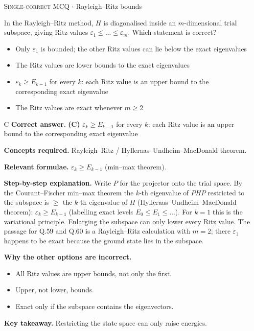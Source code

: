 \documentclass[11pt,a4paper]{article}
\newcommand{\optlabel}[1]{\textbf{(#1)}}
\newcommand{\correctlabel}[1]{\textcolor{okgreen}{\textbf{(#1)}\,\ding{51}}}
\newenvironment{qitem}[1]{\begin{list}{}{\setlength{\leftmargin}{3.3em}\setlength{\labelwidth}{3.1em}%
  \setlength{\labelsep}{0.2em}\setlength{\topsep}{3pt}\setlength{\parsep}{3pt}}\item[\textbf{Q.#1}\hfill]}{\end{list}}
\newcommand{\qsep}{\par\vspace{2pt}{\color{black!15}\hrule}\vspace{4pt}}
\newcommand{\qmeta}[2]{{\footnotesize\color{black!60}\textsc{#1} \;$\cdot$\; #2}\par}
\begin{document}
\begin{qitem}{42}
\qmeta{Single-correct MCQ}{Rayleigh--Ritz bounds}
In the Rayleigh--Ritz method, $H$ is diagonalised inside an $m$-dimensional trial subspace, giving Ritz values $\varepsilon_1 \le \dots \le \varepsilon_m$. Which
statement is correct?
\begin{itemize}[leftmargin=2.6em, labelsep=0.4em, itemsep=2pt, topsep=3pt]
\item[\optlabel{A}] Only $\varepsilon_1$ is bounded; the other Ritz values can lie below the exact eigenvalues
\item[\optlabel{B}] The Ritz values are lower bounds to the exact eigenvalues
\item[\correctlabel{C}] $\varepsilon_k \ge E_{k-1}$ for every $k$: each Ritz value is an upper bound to the corresponding exact eigenvalue
\item[\optlabel{D}] The Ritz values are exact whenever $m \ge 2$
\end{itemize}
\end{qitem}
\begin{solbox}{C}
\textbf{\color{brand}Correct answer.} \textcolor{okgreen}{\textbf{(C)}} $\varepsilon_k \ge E_{k-1}$ for every $k$: each Ritz value is an upper bound to the corresponding exact eigenvalue

\textbf{\color{brand}Concepts required.} Rayleigh--Ritz / Hylleraas--Undheim--MacDonald theorem.

\textbf{\color{brand}Relevant formulae.} $\varepsilon_k \ge E_{k-1}$ (min--max theorem).

\textbf{\color{brand}Step-by-step explanation.} Write $P$ for the projector onto the trial space. By the Courant--Fischer min--max theorem the $k$-th eigenvalue of $PHP$ restricted to the
subspace is $\ge$ the $k$-th eigenvalue of $H$ (Hylleraas--Undheim--MacDonald theorem): $\varepsilon_k \ge E_{k-1}$ (labelling exact levels
$E_0 \le E_1 \le \dots$). For $k = 1$ this is the variational principle. Enlarging the subspace can only lower every Ritz value. The passage for
Q.59 and Q.60 is a Rayleigh--Ritz calculation with $m = 2$; there $\varepsilon_1$ happens to be exact because the ground state lies in the subspace.

\textbf{\color{brand}Why the other options are incorrect.}
\begin{itemize}[leftmargin=2.4em, itemsep=1pt, topsep=2pt]
\item[\textbf{(A)}] All Ritz values are upper bounds, not only the first.
\item[\textbf{(B)}] Upper, not lower, bounds.
\item[\textbf{(D)}] Exact only if the subspace contains the eigenvectors.
\end{itemize}
\textbf{\color{brand}Key takeaway.} Restricting the state space can only raise energies.
\end{solbox}
\qsep
\end{document}

